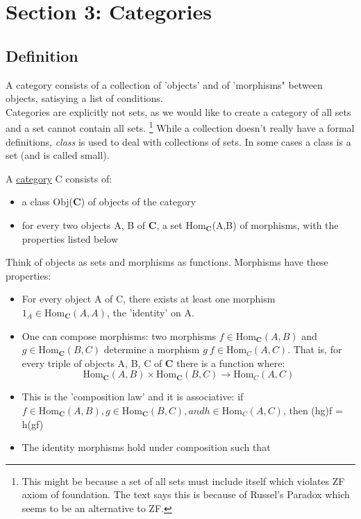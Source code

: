 \section{Section 3: Categories}
\subsection{Definition}
A category consists of a collection of 'objects' and of 'morphisms" between objects, satisying a list of conditions.
\\
Categories are explicitly not sets, as we would like to create a category of all sets and a set cannot contain all sets. 
\footnote{This might be because a set of all sets must include itself which violates ZF axiom of foundation. The text says this is because of Russel's Paradox which seems to be an alternative to ZF.}
While a collection doesn't really have a formal definitions, \textit{class} is used to deal with collections of sets. In some cases a class is a set (and is called small).
\begin{definition}
  A \underline{category} C consists of:
  \begin{itemize}
    \item a class Obj(\textbf{C}) of objects of the category
    \item for every two objects A, B of \textbf{C}, a set Hom$_{\textbf{C}}$(A,B) of morphisms, with the properties listed below
  \end{itemize}
\end{definition}
Think of objects as sets and morphisms as functions. Morphisms have these properties: 
\begin{itemize}
  \item For every object A of C, there exists at least one morphism $1_A \in \text{Hom}_{\textbf{C}}(A,A)$, the 'identity' on A.
  \item One can compose morphisms: 
  two morphisms $f \in \text{Hom}_{\textbf{C}} (A,B)$ and $g \in \text{Hom}_{\textbf{C}} (B,C)$ determine a morphism $g \: f \in \text{Hom}_C(A,C)$.
  That is, for every triple of objects A, B, C of \textbf{C} there is a function where:
  \[\text{Hom}_{\textbf{C}} (A,B) \times \text{Hom}_{\textbf{C}} (B,C) \to \text{Hom}_C(A,C)\]
  \item This is the 'composition law' and it is associative: if $f \in \text{Hom}_{\textbf{C}} (A,B), g \in \text{Hom}_{\textbf{C}} (B,C), and h \in \text{Hom}_C(A,C)$, then (hg)f = h(gf)
  \item The identity morphisms hold under composition such that
\end{itemize}
